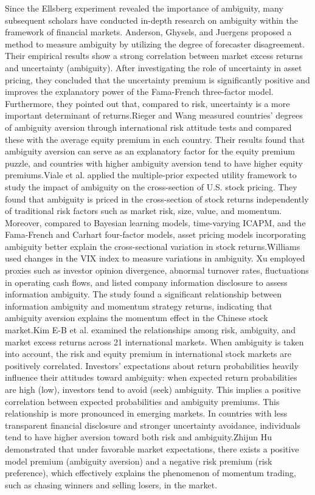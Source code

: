 \documentclass[preprint,12pt,authoryear]{elsarticle}
\begin{document}
Since the Ellsberg experiment revealed the importance of ambiguity, many subsequent scholars have conducted in-depth research on ambiguity within the framework of financial markets. Anderson, Ghysels, and Juergens \cite{anderson2009} proposed a method to measure ambiguity by utilizing the degree of forecaster disagreement. Their empirical results show a strong correlation between market excess returns and uncertainty (ambiguity). After investigating the role of uncertainty in asset pricing, they concluded that the uncertainty premium is significantly positive and improves the explanatory power of the Fama-French three-factor model. Furthermore, they pointed out that, compared to risk, uncertainty is a more important determinant of returns.Rieger and Wang \cite{rieger2012} measured countries’ degrees of ambiguity aversion through international risk attitude tests and compared these with the average equity premium in each country. Their results found that ambiguity aversion can serve as an explanatory factor for the equity premium puzzle, and countries with higher ambiguity aversion tend to have higher equity premiums.Viale et al.\cite{ariel2014} applied the multiple-prior expected utility framework to study the impact of ambiguity on the cross-section of U.S. stock pricing. They found that ambiguity is priced in the cross-section of stock returns independently of traditional risk factors such as market risk, size, value, and momentum. Moreover, compared to Bayesian learning models, time-varying ICAPM, and the Fama-French and Carhart four-factor models, asset pricing models incorporating ambiguity better explain the cross-sectional variation in stock returns.Williams \cite{williams2015} used changes in the VIX index to measure variations in ambiguity. Xu \cite{xu2016} employed proxies such as investor opinion divergence, abnormal turnover rates, fluctuations in operating cash flows, and listed company information disclosure to assess information ambiguity. The study found a significant relationship between information ambiguity and momentum strategy returns, indicating that ambiguity aversion explains the momentum effect in the Chinese stock market.Kim E-B et al. \cite{kim2021} examined the relationships among risk, ambiguity, and market excess returns across 21 international markets. When ambiguity is taken into account, the risk and equity premium in international stock markets are positively correlated. Investors’ expectations about return probabilities heavily influence their attitudes toward ambiguity: when expected return probabilities are high (low), investors tend to avoid (seek) ambiguity. This implies a positive correlation between expected probabilities and ambiguity premiums. This relationship is more pronounced in emerging markets. In countries with less transparent financial disclosure and stronger uncertainty avoidance, individuals tend to have higher aversion toward both risk and ambiguity.Zhijun Hu\cite{hu2022} demonstrated that under favorable market expectations, there exists a positive model premium (ambiguity aversion) and a negative risk premium (risk preference), which effectively explains the phenomenon of momentum trading, such as chasing winners and selling losers, in the market.
\end{document}
